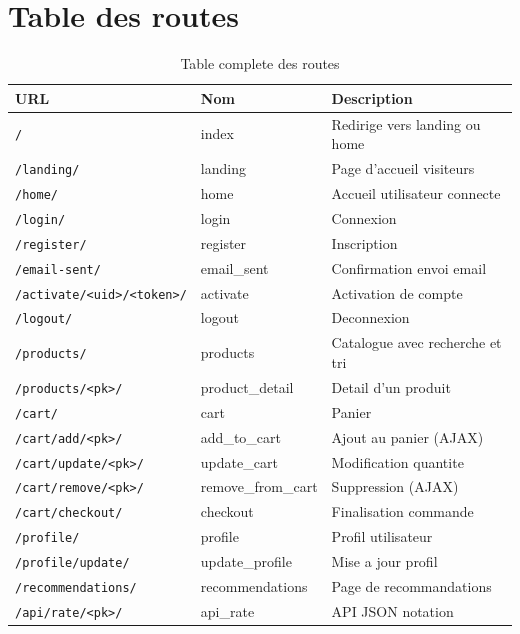 \documentclass[12pt,a4paper]{report}
\begin{document}
\section{Table des routes}

\begin{table}[h]
\centering
\begin{tabularx}{\linewidth}{@{}llX@{}}
\toprule
\textbf{URL} & \textbf{Nom} & \textbf{Description} \\
\midrule
\texttt{/}                        & index          & Redirige vers landing ou home \\
\texttt{/landing/}                & landing        & Page d'accueil visiteurs \\
\texttt{/home/}                   & home           & Accueil utilisateur connecte \\
\texttt{/login/}                  & login          & Connexion \\
\texttt{/register/}               & register       & Inscription \\
\texttt{/email-sent/}             & email\_sent    & Confirmation envoi email \\
\texttt{/activate/<uid>/<token>/} & activate       & Activation de compte \\
\texttt{/logout/}                 & logout         & Deconnexion \\
\texttt{/products/}               & products       & Catalogue avec recherche et tri \\
\texttt{/products/<pk>/}          & product\_detail & Detail d'un produit \\
\texttt{/cart/}                   & cart           & Panier \\
\texttt{/cart/add/<pk>/}          & add\_to\_cart  & Ajout au panier (AJAX) \\
\texttt{/cart/update/<pk>/}       & update\_cart   & Modification quantite \\
\texttt{/cart/remove/<pk>/}       & remove\_from\_cart & Suppression (AJAX) \\
\texttt{/cart/checkout/}          & checkout       & Finalisation commande \\
\texttt{/profile/}                & profile        & Profil utilisateur \\
\texttt{/profile/update/}         & update\_profile & Mise a jour profil \\
\texttt{/recommendations/}        & recommendations & Page de recommandations \\
\texttt{/api/rate/<pk>/}          & api\_rate      & API JSON notation \\
\bottomrule
\end{tabularx}
\caption{Table complete des routes}
\end{table}
\end{document}
